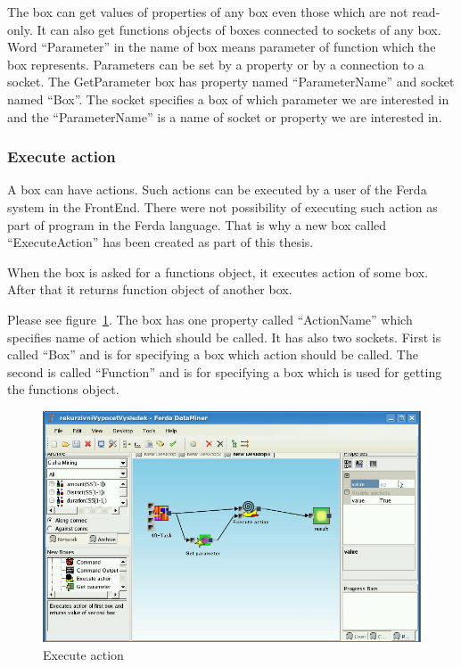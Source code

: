 \documentclass[a4paper,12pt]{book}
\begin{document}
The box can get values of properties of any box even those which are not read-only. It can also get functions objects of boxes connected to sockets of any box. Word ``Parameter'' in the name of box means parameter of function which the box represents. Parameters can be set by a property or by a connection to a socket. The GetParameter box has property named ``ParameterName'' and socket named ``Box''. The socket specifies a box of which parameter we are interested in and the ``ParameterName'' is a name of socket or property we are interested in.

\subsubsection{Execute action}
A box can have actions. Such actions can be executed by a user of the Ferda system in the FrontEnd. There were not possibility of executing such action as part of program in the Ferda language. That is why a new box called ``ExecuteAction'' has been created as part of this thesis.

When the box is asked for a functions object, it executes action of some box. After that it returns function object of another box.

Please see figure~\ref{fig:boxExecuteAction}. The box has one property called ``ActionName'' which specifies name of action which should be called. It has also two sockets. First is called ``Box'' and is for specifying a box which action should be called. The second is called ``Function'' and is for specifying a box which is used for getting the functions object.

\begin{figure}
	\includegraphics[width=1\textwidth]{executeAction2.png}
	\caption{Execute action}
	\label{fig:boxExecuteAction}
\end{figure}
\end{document}
